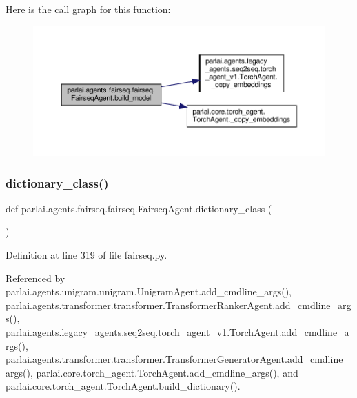 Here is the call graph for this function\+:
\nopagebreak
\begin{figure}[H]
\begin{center}
\leavevmode
\includegraphics[width=350pt]{classparlai_1_1agents_1_1fairseq_1_1fairseq_1_1FairseqAgent_a275a60cb93929725725d103fc76905ba_cgraph}
\end{center}
\end{figure}
\mbox{\label{classparlai_1_1agents_1_1fairseq_1_1fairseq_1_1FairseqAgent_a3dc59646a2e97d015dfdddb65021429b}} 
\subsubsection{\texorpdfstring{dictionary\+\_\+class()}{dictionary\_class()}}
{\footnotesize\ttfamily def parlai.\+agents.\+fairseq.\+fairseq.\+Fairseq\+Agent.\+dictionary\+\_\+class (\begin{DoxyParamCaption}{ }\end{DoxyParamCaption})\hspace{0.3cm}{\ttfamily [static]}}



Definition at line 319 of file fairseq.\+py.



Referenced by parlai.\+agents.\+unigram.\+unigram.\+Unigram\+Agent.\+add\+\_\+cmdline\+\_\+args(), parlai.\+agents.\+transformer.\+transformer.\+Transformer\+Ranker\+Agent.\+add\+\_\+cmdline\+\_\+args(), parlai.\+agents.\+legacy\+\_\+agents.\+seq2seq.\+torch\+\_\+agent\+\_\+v1.\+Torch\+Agent.\+add\+\_\+cmdline\+\_\+args(), parlai.\+agents.\+transformer.\+transformer.\+Transformer\+Generator\+Agent.\+add\+\_\+cmdline\+\_\+args(), parlai.\+core.\+torch\+\_\+agent.\+Torch\+Agent.\+add\+\_\+cmdline\+\_\+args(), and parlai.\+core.\+torch\+\_\+agent.\+Torch\+Agent.\+build\+\_\+dictionary().

